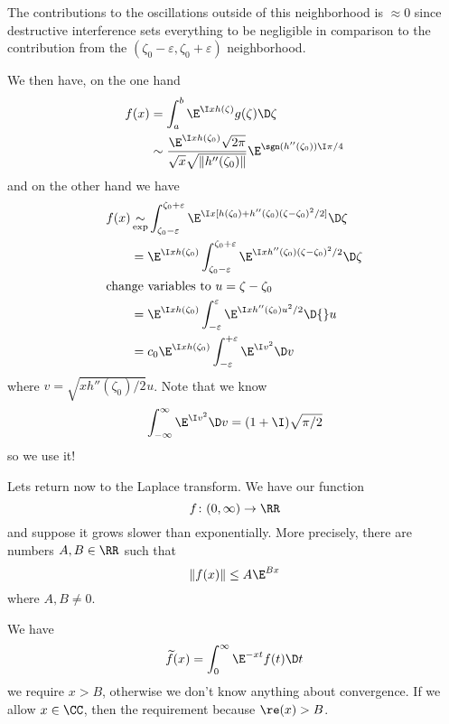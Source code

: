 The contributions to the oscillations outside of this
neighborhood is $\approx0$ since destructive interference sets
everything to be negligible in comparison to the contribution
from the $(\zeta_{0}-\varepsilon,\zeta_{0}+\varepsilon)$
neighborhood.

We then have, on the one hand
\begin{subequations}
\begin{align}
f(x) &= \int^{b}_{a}\E^{\I xh(\zeta)}g(\zeta)\D\zeta\\
&\asymptote\frac{\E^{\I xh(\zeta_{0})}\sqrt{2\pi}}{\sqrt{x}\sqrt{\|h''(\zeta_{0})\|}}\E^{\sgn(h''(\zeta_{0}))\I\pi/4}
\end{align}
\end{subequations}
and on the other hand we have
\begin{subequations}
\begin{align}
f(x)
&\expequiv\int^{\zeta_{0}+\varepsilon}_{\zeta_{0}-\varepsilon}\E^{\I x[h(\zeta_{0})+h''(\zeta_{0})(\zeta-\zeta_{0})^{2}/2]}\D\zeta\\
&=\E^{\I xh(\zeta_{0})}\int^{\zeta_{0}+\varepsilon}_{\zeta_{0}-\varepsilon}\E^{\I xh''(\zeta_{0})(\zeta-\zeta_{0})^{2}/2}\D\zeta\\
\intertext{change variables to $u=\zeta-\zeta_{0}$}
&=\E^{\I xh(\zeta_{0})}\int^{\varepsilon}_{-\varepsilon}\E^{\I xh''(\zeta_{0})u^{2}/2}\D{}u\\
&=c_{0}\E^{\I xh(\zeta_{0})}\int^{+\varepsilon}_{-\varepsilon}
\E^{\I v^{2}}\D v
\end{align}
\end{subequations}
where $v=\sqrt{xh''(\zeta_{0})/2}u$. Note that we know
\begin{equation}
\int^{\infty}_{-\infty}\E^{\I v^{2}}\D v=(1+\I)\sqrt{\pi/2}
\end{equation}
so we use it!

Lets return now to the Laplace transform. We have our function
\begin{equation}
f\colon(0,\infty)\to\RR
\end{equation}
and suppose it grows slower than exponentially. More precisely,
there are numbers $A,B\in\RR$ such that
\begin{equation}
\|f(x)\|\leq A\E^{Bx}
\end{equation}
where $A,B\not=0$.

We have
\begin{equation}
\widetilde{f}(x)=\int^{\infty}_{0}\E^{-xt}f(t)\D t
\end{equation}
we require $x>B$, otherwise we don't know anything about
convergence. If we allow $x\in\CC$, then the requirement because
$\re(x)>B$. 

